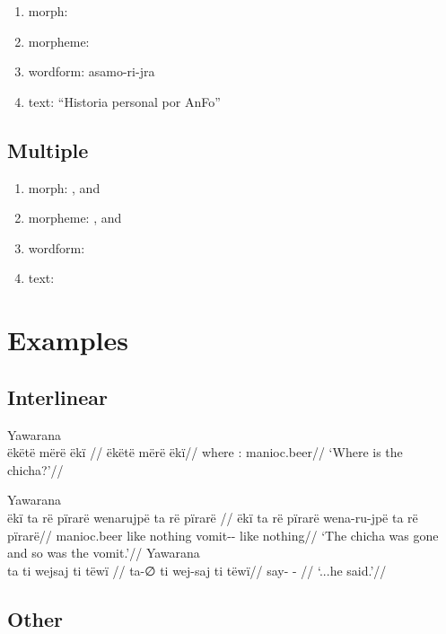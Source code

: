 \documentclass{memoir}
\begin{document}
\begin{enumerate}
\def\labelenumi{\arabic{enumi}.}
\tightlist
\item
  morph: 
\item
  morpheme: 
\item
  wordform: asamo-ri-jra
\item
  text: ``Historia personal por AnFo''
\end{enumerate}

\subsection{Multiple}

\begin{enumerate}
\def\labelenumi{\arabic{enumi}.}
\tightlist
\item
  morph: , and 
\item
  morpheme: , and 
\item
  wordform:\\
\item
  text:
\end{enumerate}

\section{Examples}

\subsection{Interlinear}

\ex Yawarana \\
\label{ctorat-34}\begingl
\glpreamble  ëkëtë mërë ëkï //
\gla ëkëtë mërë ëkï//
\glb where : manioc.beer//
\glft ‘Where is the chicha?’//  
\endgl 
\xe

\pex\label{}\a Yawarana\\
\label{ctorat-35}\begingl
\glpreamble  ëkï ta rë pïrarë wenarujpë ta rë pïrarë //
\gla ëkï ta rë pïrarë wena-ru-jpë ta rë pïrarë//
\glb manioc.beer like  nothing vomit-- like  nothing//
\glft ‘The chicha was gone and so was the vomit.’//  
\endgl 
\a Yawarana\\
\label{ctorat-36}\begingl
\glpreamble  ta ti wejsaj ti tëwï //
\gla ta-∅ ti wej-saj ti tëwï//
\glb say-  -  //
\glft ‘...he said.’//  
\endgl 
\xe

\subsection{Other}
\end{document}
